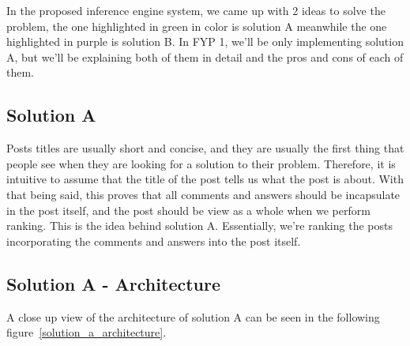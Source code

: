 In the proposed inference engine system, we came up with 2 ideas to solve the problem, the one highlighted in green in color is solution A meanwhile the one highlighted in purple is solution B. In FYP 1, we'll be only implementing solution A, but we'll be explaining both of them in detail and the pros and cons of each of them.

\subsection{Solution A}
Posts titles are usually short and concise, and they are usually the first thing that people see when they are looking for a solution to their problem. Therefore, it is intuitive to assume that the title of the post tells us what the post is about. With that being said, this proves that all comments and answers should be incapsulate in the post itself, and the post should be view as a whole when we perform ranking. This is the idea behind solution A. Essentially, we're ranking the posts incorporating the comments and answers into the post itself.

\subsection{Solution A - Architecture}
A close up view of the architecture of solution A can be seen in the following figure~\ref*{solution_a_architecture}.


